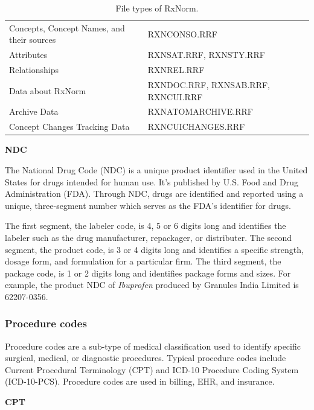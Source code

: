 \begin{table}[ht]
\centering
\begin{tabular}{ll}
\toprule
Concepts, Concept Names, and their sources & RXNCONSO.RRF                       \\ 
Attributes                                 & RXNSAT.RRF, RXNSTY.RRF             \\ 
Relationships                              & RXNREL.RRF                         \\ 
Data about RxNorm                          & RXNDOC.RRF, RXNSAB.RRF, RXNCUI.RRF \\ 
Archive Data                               & RXNATOMARCHIVE.RRF                 \\ 
Concept Changes Tracking Data              & RXNCUICHANGES.RRF                  \\ \bottomrule
\end{tabular}
\caption{File types of RxNorm.}
\label{tab:rxnormtype}
\end{table}

\textbf{NDC}

The National Drug Code (NDC) is a unique product identifier used in the United States for drugs intended for human use. It's published by U.S. Food and Drug Administration (FDA). Through NDC, drugs are identified and reported using a unique, three-segment number which serves as the FDA's identifier for drugs. 

The first segment, the labeler code, is 4, 5 or 6 digits long and identifies the labeler such as the drug manufacturer, repackager, or distributer. The second segment, the product code, is 3 or 4 digits long and identifies a specific strength, dosage form, and formulation for a particular firm. The third segment, the package code, is 1 or 2 digits long and identifies package forms and sizes. For example, the product NDC of \textit{Ibuprofen} produced by Granules India Limited is 62207-0356.

\subsubsection{Procedure codes}
Procedure codes are a sub-type of medical classification used to identify specific surgical, medical, or diagnostic procedures. Typical procedure codes include Current Procedural Terminology (CPT) and ICD-10 Procedure Coding System (ICD-10-PCS). Procedure codes are used in billing, EHR, and insurance.

\textbf{CPT}

